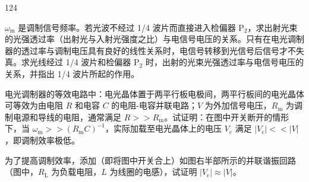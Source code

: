 \begin{problem}[2020第37届全国中学生物理竞赛复赛][电光调制器原理与电路分析]{124}
\begin{subproblem}
\begin{equation}
        \end{equation}
        $\omega_{\mathrm{m}}$ 是调制信号频率。若光波不经过 1/4 波片而直接进入检偏器 $\mathrm{P}_{2}$，求出射光束的光强透过率（出射光与入射光强度之比）与电信号电压的关系。只有在电光调制器的透过率与调制电压具有良好的线性关系时，电信号转移到光信号后信号才不失真。求光线经过 1/4 波片和检偏器 $\mathrm{P}_{2}$ 时，出射的光束光强透过率与电信号电压的关系，并指出 1/4 波片所起的作用。
    \end{subproblem}
    \begin{subproblem}
        电光调制器的等效电路中：电光晶体置于两平行板电极间，两平行板间的电光晶体可等效为由电阻 $R$ 和电容 $C$ 的电阻-电容并联电路；$V$ 为外加信号电压，$R_{\mathrm{m}}$ 为调制电源和导线的电阻，通常满足 $R >> R_{\mathrm{m}}$。试证明：在图中开关断开的情形下，当 $\omega_{\mathrm{m}} >> (R_{\mathrm{m}} C)^{-1}$，实际加载至电光晶体上的电压 $V_{\mathrm{c}}$ 满足 $|V_{\mathrm{c}}| << |V|$，即调制效率极低。
    \end{subproblem}
    \begin{subproblem}
        为了提高调制效率，添加（即将图中开关合上）如图右半部所示的并联谐振回路（图中，$R_{\mathrm{L}}$ 为负载电阻，$L$ 为线圈的电感），试证明 $|V_{\mathrm{c}}| \approx |V|$。
    \end{subproblem}
\end{problem}
